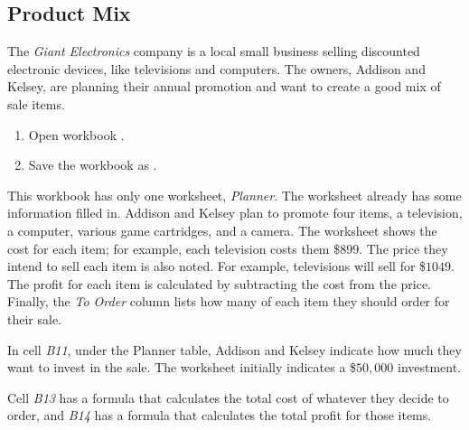 \subsection{Product Mix}

The \textit{Giant Electronics} company is a local small business selling discounted electronic devices, like televisions and computers. The owners, Addison and Kelsey, are planning their annual promotion and want to create a good mix of sale items.

\begin{enumbox}
	\begin{enumerate}
		\item Open workbook .
		\item Save the workbook as .
	\end{enumerate}
\end{enumbox}

This workbook has only one worksheet, \textit{Planner}. The worksheet already has some information filled in. Addison and Kelsey plan to promote four items, a television, a computer, various game cartridges, and a camera. The worksheet shows the cost for each item; for example, each television costs them \$$ 899 $. The price they intend to sell each item is also noted. For example, televisions will sell for \$$ 1049 $. The profit for each item is calculated by subtracting the cost from the price. Finally, the \textit{To Order} column lists how many of each item they should order for their sale.

In cell \textit{B11}, under the Planner table, Addison and Kelsey indicate how much they want to invest in the sale. The worksheet initially indicates a \$$ 50,000 $ investment.

Cell \textit{B13} has a formula that calculates the total cost of whatever they decide to order, and \textit{B14} has a formula that calculates the total profit for those items.

